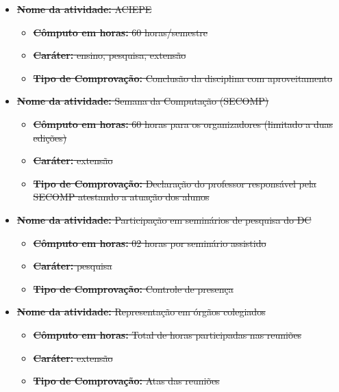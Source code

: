 \begin{itemize}
\item \sout{{\bf Nome da atividade:} ACIEPE}
\begin{itemize}
\item \sout{{\bf Cômputo em horas:} 60 horas/semestre}
\item \sout{{\bf Caráter:} ensino, pesquisa, extensão}
\item \sout{{\bf Tipo de Comprovação:} Conclusão da disciplina com aproveitamento}
\end{itemize}
\end{itemize}

\begin{itemize}
\item \sout{{\bf Nome da atividade:} Semana da Computação (SECOMP)}
\begin{itemize}
\item \sout{{\bf Cômputo em horas:} 60 horas para os organizadores
(limitado a duas edições)}
\item \sout{{\bf Caráter:} extensão}
\item \sout{{\bf Tipo de Comprovação:} Declaração do professor responsável pela SECOMP atestando a atuação dos alunos}
\end{itemize}
\end{itemize}

\begin{itemize}
\item \sout{{\bf Nome da atividade:} Participação em seminários de pesquisa do DC}
\begin{itemize}
\item \sout{{\bf Cômputo em horas:} 02 horas por seminário assistido}
\item \sout{{\bf Caráter:} pesquisa}
\item \sout{{\bf Tipo de Comprovação:} Controle de presença}
\end{itemize}
\end{itemize}

\begin{itemize}
\item \sout{{\bf Nome da atividade:} Representação em órgãos colegiados}
\begin{itemize}
\item \sout{{\bf Cômputo em horas:} Total de horas participadas nas reuniões}
\item \sout{{\bf Caráter:} extensão}
\item \sout{{\bf Tipo de Comprovação:} Atas das reuniões}
\end{itemize}
\end{itemize}

